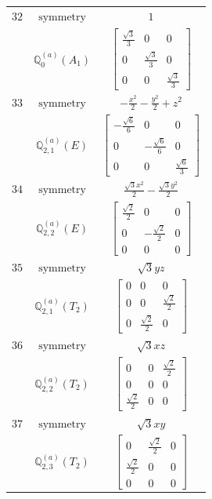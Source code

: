 \documentclass[fleqn,8pt,landscape]{jsarticle}
\begin{document}
\begin{longtable}{ccc}
$ 32 $ & $ \text{symmetry} $ & $ 1 $ \\
$  $ & $ \mathbb{Q}_{0}^{(a)}(A_{1}) $ & $ \begin{bmatrix} \frac{\sqrt{3}}{3} & 0 & 0 \\ 0 & \frac{\sqrt{3}}{3} & 0 \\ 0 & 0 & \frac{\sqrt{3}}{3} \end{bmatrix} $ \\ \hline
$ 33 $ & $ \text{symmetry} $ & $ - \frac{x^{2}}{2} - \frac{y^{2}}{2} + z^{2} $ \\
$  $ & $ \mathbb{Q}_{2,1}^{(a)}(E) $ & $ \begin{bmatrix} - \frac{\sqrt{6}}{6} & 0 & 0 \\ 0 & - \frac{\sqrt{6}}{6} & 0 \\ 0 & 0 & \frac{\sqrt{6}}{3} \end{bmatrix} $ \\ \hline
$ 34 $ & $ \text{symmetry} $ & $ \frac{\sqrt{3} x^{2}}{2} - \frac{\sqrt{3} y^{2}}{2} $ \\
$  $ & $ \mathbb{Q}_{2,2}^{(a)}(E) $ & $ \begin{bmatrix} \frac{\sqrt{2}}{2} & 0 & 0 \\ 0 & - \frac{\sqrt{2}}{2} & 0 \\ 0 & 0 & 0 \end{bmatrix} $ \\ \hline
$ 35 $ & $ \text{symmetry} $ & $ \sqrt{3} y z $ \\
$  $ & $ \mathbb{Q}_{2,1}^{(a)}(T_{2}) $ & $ \begin{bmatrix} 0 & 0 & 0 \\ 0 & 0 & \frac{\sqrt{2}}{2} \\ 0 & \frac{\sqrt{2}}{2} & 0 \end{bmatrix} $ \\ \hline
$ 36 $ & $ \text{symmetry} $ & $ \sqrt{3} x z $ \\
$  $ & $ \mathbb{Q}_{2,2}^{(a)}(T_{2}) $ & $ \begin{bmatrix} 0 & 0 & \frac{\sqrt{2}}{2} \\ 0 & 0 & 0 \\ \frac{\sqrt{2}}{2} & 0 & 0 \end{bmatrix} $ \\ \hline
$ 37 $ & $ \text{symmetry} $ & $ \sqrt{3} x y $ \\
$  $ & $ \mathbb{Q}_{2,3}^{(a)}(T_{2}) $ & $ \begin{bmatrix} 0 & \frac{\sqrt{2}}{2} & 0 \\ \frac{\sqrt{2}}{2} & 0 & 0 \\ 0 & 0 & 0 \end{bmatrix} $ \\ \hline

\end{longtable}
\end{document}
